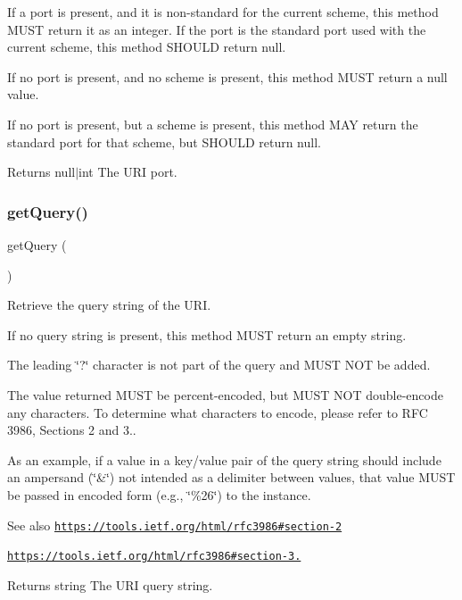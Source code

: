 If a port is present, and it is non-\/standard for the current scheme, this method M\+U\+ST return it as an integer. If the port is the standard port used with the current scheme, this method S\+H\+O\+U\+LD return null.

If no port is present, and no scheme is present, this method M\+U\+ST return a null value.

If no port is present, but a scheme is present, this method M\+AY return the standard port for that scheme, but S\+H\+O\+U\+LD return null.

\begin{DoxyReturn}{Returns}
null$\vert$int The U\+RI port. 
\end{DoxyReturn}
\mbox{\label{class_pes_1_1_http_1_1_uri_a55f162785567258fe5138af282e588c2}} 
\subsubsection{\texorpdfstring{get\+Query()}{getQuery()}}
{\footnotesize\ttfamily get\+Query (\begin{DoxyParamCaption}{ }\end{DoxyParamCaption})}

Retrieve the query string of the U\+RI.

If no query string is present, this method M\+U\+ST return an empty string.

The leading \char`\"{}?\char`\"{} character is not part of the query and M\+U\+ST N\+OT be added.

The value returned M\+U\+ST be percent-\/encoded, but M\+U\+ST N\+OT double-\/encode any characters. To determine what characters to encode, please refer to R\+FC 3986, Sections 2 and 3..

As an example, if a value in a key/value pair of the query string should include an ampersand (\char`\"{}\&\char`\"{}) not intended as a delimiter between values, that value M\+U\+ST be passed in encoded form (e.\+g., \char`\"{}\%26\char`\"{}) to the instance.

\begin{DoxySeeAlso}{See also}
\href{https://tools.ietf.org/html/rfc3986#section-2}{\tt https\+://tools.\+ietf.\+org/html/rfc3986\#section-\/2} 

\href{https://tools.ietf.org/html/rfc3986#section-3.4}{\tt https\+://tools.\+ietf.\+org/html/rfc3986\#section-\/3.} 
\end{DoxySeeAlso}
\begin{DoxyReturn}{Returns}
string The U\+RI query string. 
\end{DoxyReturn}
\mbox{\label{class_pes_1_1_http_1_1_uri_a812bc167005f6f5852c53693fb0156bb}} 
